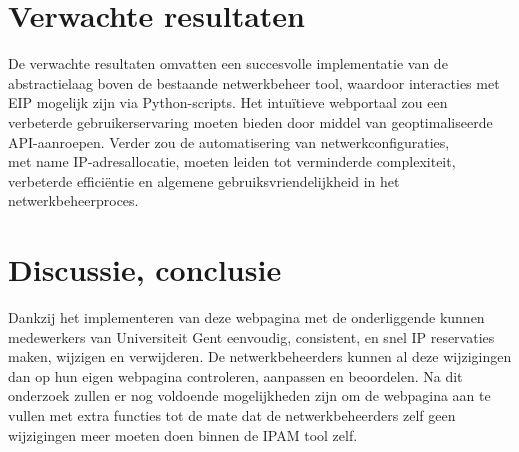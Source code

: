 \documentclass{hogent-article}
\begin{document}

\section{Verwachte resultaten}
\label{sec:verwachte-resultaten}
De verwachte resultaten omvatten een succesvolle implementatie van de abstractielaag boven de bestaande netwerkbeheer tool, waardoor interacties met EIP mogelijk zijn via Python-scripts. Het intuïtieve webportaal zou een verbeterde gebruikerservaring moeten bieden door middel van geoptimaliseerde API-aanroepen. Verder zou de automatisering van netwerkconfiguraties, \\met name IP-adresallocatie, moeten leiden tot verminderde complexiteit, verbeterde efficiëntie en algemene gebruiksvriendelijkheid in het netwerkbeheerproces.


\section{Discussie, conclusie}
\label{sec:discussie-conclusie}
Dankzij het implementeren van deze webpagina met de onderliggende kunnen medewerkers van Universiteit Gent eenvoudig, consistent, en snel IP reservaties maken, wijzigen en verwijderen. De netwerkbeheerders kunnen al deze wijzigingen dan op hun eigen webpagina controleren, aanpassen en beoordelen.
Na dit onderzoek zullen er nog voldoende mogelijkheden zijn om de webpagina aan te vullen met extra functies tot de mate dat de netwerkbeheerders zelf geen wijzigingen meer moeten doen binnen de IPAM tool zelf.


\printbibliography[heading=bibintoc]
\end{document}
